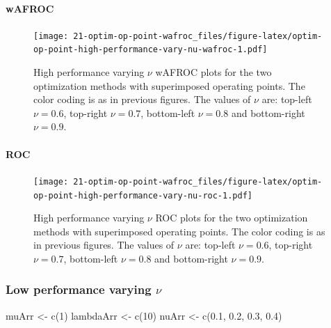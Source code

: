 \documentclass[
]{book}
\newenvironment{Shaded}{\begin{snugshade}}{\end{snugshade}}
\newcommand{\DecValTok}[1]{\textcolor[rgb]{0.00,0.00,0.81}{#1}}
\newcommand{\FloatTok}[1]{\textcolor[rgb]{0.00,0.00,0.81}{#1}}
\newcommand{\FunctionTok}[1]{\textcolor[rgb]{0.00,0.00,0.00}{#1}}
\newcommand{\NormalTok}[1]{#1}
\newcommand{\OtherTok}[1]{\textcolor[rgb]{0.56,0.35,0.01}{#1}}
\begin{document}
\hypertarget{wafroc-9}{%
\paragraph{wAFROC}\label{wafroc-9}}

\begin{figure}
\centering
\texttt{[image: 21-optim-op-point-wafroc\_files/figure-latex/optim-op-point-high-performance-vary-nu-wafroc-1.pdf]}
\caption{\label{fig:optim-op-point-high-performance-vary-nu-wafroc}High performance varying \(\nu\) wAFROC plots for the two optimization methods with superimposed operating points. The color coding is as in previous figures. The values of \(\nu\) are: top-left \(\nu = 0.6\), top-right \(\nu = 0.7\), bottom-left \(\nu = 0.8\) and bottom-right \(\nu = 0.9\).}
\end{figure}

\hypertarget{roc-9}{%
\paragraph{ROC}\label{roc-9}}

\begin{figure}
\centering
\texttt{[image: 21-optim-op-point-wafroc\_files/figure-latex/optim-op-point-high-performance-vary-nu-roc-1.pdf]}
\caption{\label{fig:optim-op-point-high-performance-vary-nu-roc}High performance varying \(\nu\) ROC plots for the two optimization methods with superimposed operating points. The color coding is as in previous figures. The values of \(\nu\) are: top-left \(\nu = 0.6\), top-right \(\nu = 0.7\), bottom-left \(\nu = 0.8\) and bottom-right \(\nu = 0.9\).}
\end{figure}

\hypertarget{optim-op-point-low-performance-vary-nu}{%
\subsubsection{\texorpdfstring{Low performance varying \(\nu\)}{Low performance varying \textbackslash nu}}\label{optim-op-point-low-performance-vary-nu}}

\begin{Shaded}
\begin{Highlighting}[]
\NormalTok{muArr }\OtherTok{\textless{}{-}} \FunctionTok{c}\NormalTok{(}\DecValTok{1}\NormalTok{)}
\NormalTok{lambdaArr }\OtherTok{\textless{}{-}} \FunctionTok{c}\NormalTok{(}\DecValTok{10}\NormalTok{)}
\NormalTok{nuArr }\OtherTok{\textless{}{-}} \FunctionTok{c}\NormalTok{(}\FloatTok{0.1}\NormalTok{, }\FloatTok{0.2}\NormalTok{, }\FloatTok{0.3}\NormalTok{, }\FloatTok{0.4}\NormalTok{)}
\end{Highlighting}
\end{Shaded}
\end{document}

